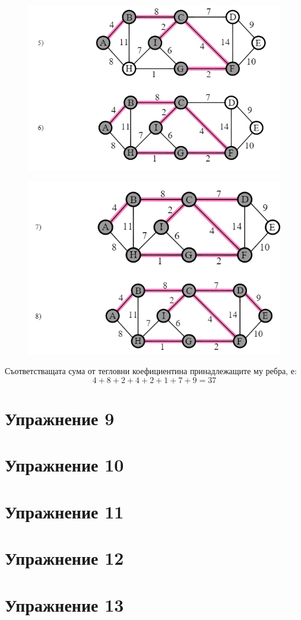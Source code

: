 \documentclass[fleqn, 12pt]{article}
\theoremstyle{definition}
\begin{document}
\begin{figure} [htp!]
\includegraphics{Pics/Discrete math/ex8/ex8-task8-3.png}
\end{figure}
\begin{figure} [htp!]
\includegraphics{Pics/Discrete math/ex8/ex8-task8-4.png}
\end{figure}
Съответстващата сума от тегловни коефициентина принадлежащите му ребра, е:
$$ 4 + 8 + 2 + 4 + 2 + 1 + 7 + 9 = 37$$
\newpage
\section{Упражнение 9}

\newpage
\section{ Упражнение 10}

\newpage
\section{ Упражнение 11}

\newpage
\section{ Упражнение 12}

\newpage
\section{ Упражнение 13}
\end{document}
